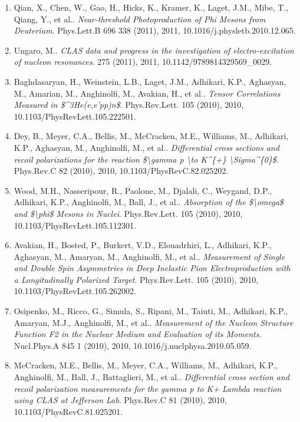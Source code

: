 \begin{enumerate}
\item Qian, X., Chen, W., Gao, H., Hicks, K., Kramer, K., Laget, J.M., Mibe, T., Qiang, Y., et al.. \textit{Near-threshold Photoproduction of Phi Mesons from Deuterium}. Phys.Lett.B 696 338 (2011), 2011, 10.1016/j.physletb.2010.12.065.
\item Ungaro, M.. \textit{CLAS data and progress in the investigation of electro-excitation of nucleon resonances}. 275 (2011), 2011, 10.1142/9789814329569\_0029.
\item Baghdasaryan, H., Weinstein, L.B., Laget, J.M., Adhikari, K.P., Aghasyan, M., Amarian, M., Anghinolfi, M., Avakian, H., et al.. \textit{Tensor Correlations Measured in \$\textasciicircum{}3He(e,e'pp)n\$}. Phys.Rev.Lett. 105 (2010), 2010, 10.1103/PhysRevLett.105.222501.
\item Dey, B., Meyer, C.A., Bellis, M., McCracken, M.E., Williams, M., Adhikari, K.P., Aghasyan, M., Anghinolfi, M., et al.. \textit{Differential cross sections and recoil polarizations for the reaction \$\textbackslash{}gamma p \textbackslash{}to K\textasciicircum{}\{+\} \textbackslash{}Sigma\textasciicircum{}\{0\}\$}. Phys.Rev.C 82 (2010), 2010, 10.1103/PhysRevC.82.025202.
\item Wood, M.H., Nasseripour, R., Paolone, M., Djalali, C., Weygand, D.P., Adhikari, K.P., Anghinolfi, M., Ball, J., et al.. \textit{Absorption of the \$\textbackslash{}omega\$ and \$\textbackslash{}phi\$ Mesons in Nuclei}. Phys.Rev.Lett. 105 (2010), 2010, 10.1103/PhysRevLett.105.112301.
\item Avakian, H., Bosted, P., Burkert, V.D., Elouadrhiri, L., Adhikari, K.P., Aghasyan, M., Amaryan, M., Anghinolfi, M., et al.. \textit{Measurement of Single and Double Spin Asymmetries in Deep Inelastic Pion Electroproduction with a Longitudinally Polarized Target}. Phys.Rev.Lett. 105 (2010), 2010, 10.1103/PhysRevLett.105.262002.
\item Osipenko, M., Ricco, G., Simula, S., Ripani, M., Taiuti, M., Adhikari, K.P., Amaryan, M.J., Anghinolfi, M., et al.. \textit{Measurement of the Nucleon Structure Function F2 in the Nuclear Medium and Evaluation of its Moments}. Nucl.Phys.A 845 1 (2010), 2010, 10.1016/j.nuclphysa.2010.05.059.
\item McCracken, M.E., Bellis, M., Meyer, C.A., Williams, M., Adhikari, K.P., Anghinolfi, M., Ball, J., Battaglieri, M., et al.. \textit{Differential cross section and recoil polarization measurements for the gamma p to K+ Lambda reaction using CLAS at Jefferson Lab}. Phys.Rev.C 81 (2010), 2010, 10.1103/PhysRevC.81.025201.

\end{enumerate}
